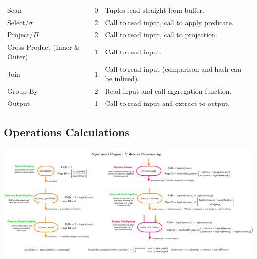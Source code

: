 \begin{center}
  \begin{tabular}{l l p{}}
    Scan & 0 & Tuples read straight from buffer. \\
    Select/$\sigma$ & 2 & Call to read input, call to apply predicate. \\
    Project/$\Pi$ & 2 & Call to read input, call to projection. \\
    Cross Product (Inner \& Outer) & 1 & Call to read input. \\
    Join & 1 & Call to read input (comparison and hash can be inlined). \\
    Group-By & 2 & Read input and call aggregation function. \\
    Output & 1 & Call to read input and extract to output. \\
   \end{tabular}
\end{center}

\subsection{Operations Calculations}
\begin{center}
  \includegraphics[width=\textwidth]{processing_models/images/spanned_pages_volcano_processing_calcs.drawio.png}
\end{center}

